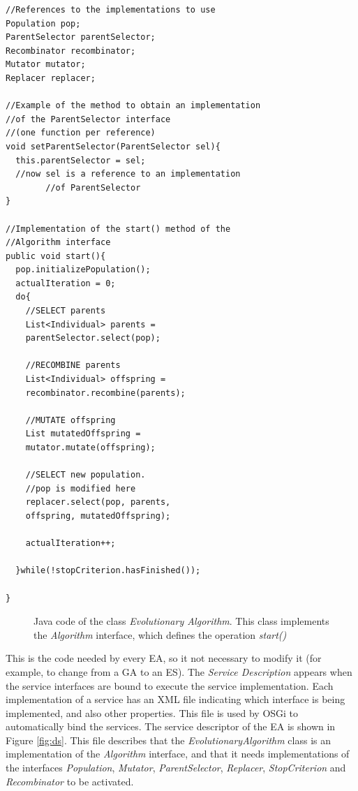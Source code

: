 \newsavebox{\mintedbox}
\begin{lrbox}{\mintedbox}
\begin{minipage}{10cm}
\begin{verbatim}
//References to the implementations to use
Population pop;
ParentSelector parentSelector;
Recombinator recombinator;
Mutator mutator;
Replacer replacer;

//Example of the method to obtain an implementation
//of the ParentSelector interface 
//(one function per reference)
void setParentSelector(ParentSelector sel){
  this.parentSelector = sel;
  //now sel is a reference to an implementation 
        //of ParentSelector
}

//Implementation of the start() method of the 
//Algorithm interface
public void start(){
  pop.initializePopulation();
  actualIteration = 0;
  do{
    //SELECT parents
    List<Individual> parents = 
    parentSelector.select(pop);
      
    //RECOMBINE parents
    List<Individual> offspring = 
    recombinator.recombine(parents);
      
    //MUTATE offspring
    List mutatedOffspring = 
    mutator.mutate(offspring);
      
    //SELECT new population. 
    //pop is modified here
    replacer.select(pop, parents, 
    offspring, mutatedOffspring);
      
    actualIteration++;
      
  }while(!stopCriterion.hasFinished());
    
}
\end{verbatim}
\end{minipage}
\end{lrbox}


\begin{figure}
\usebox{\mintedbox}
\caption{Java code of the class {\em Evolutionary Algorithm}. This class implements the {\em Algorithm} interface, which defines the operation {\em start()} } 
\label{fig:javaevo} 
\end{figure}


This is the code needed by every EA, so it not necessary to modify it (for example, to change from a GA to an ES).  The {\em Service Description} appears when the service interfaces are bound to execute the service implementation. Each implementation of a service has an XML file indicating which interface is being implemented, and also other properties. This file is used by OSGi to automatically bind the services. The service descriptor of the EA is shown in Figure \ref{fig:ds}. This file describes that the {\em EvolutionaryAlgorithm} class is an implementation of the {\em Algorithm} interface, and that it needs implementations of the interfaces {\em Population}, {\em Mutator}, {\em ParentSelector}, {\em Replacer}, {\em StopCriterion} and {\em Recombinator} to be activated.

